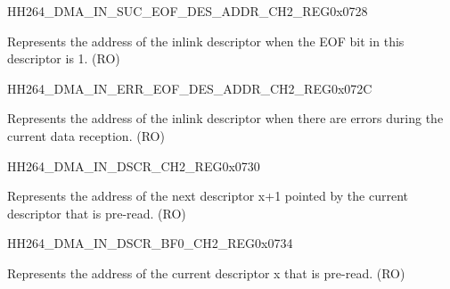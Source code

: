 \begin{register}{H}{H264\_DMA\_IN\_SUC\_EOF\_DES\_ADDR\_CH2\_REG}{0x0728}\label{regdesc:H264DMAINSUCEOFDESADDRCH2REG}
%
\regnewline%
\begin{regdesc}\begin{reglist}
\label{fielddesc:H264DMAINSUCEOFDESADDRCH2}\item [H264\_DMA\_IN\_SUC\_EOF\_DES\_ADDR\_CH2] Represents the address of the inlink descriptor when the EOF bit in this descriptor is 1. (RO)
\end{reglist}\end{regdesc}
\end{register}


\begin{register}{H}{H264\_DMA\_IN\_ERR\_EOF\_DES\_ADDR\_CH2\_REG}{0x072C}\label{regdesc:H264DMAINERREOFDESADDRCH2REG}
%
\regnewline%
\begin{regdesc}\begin{reglist}
\label{fielddesc:H264DMAINERREOFDESADDRCH2}\item [H264\_DMA\_IN\_ERR\_EOF\_DES\_ADDR\_CH2] Represents the address of the inlink descriptor when there are errors during the current data reception. (RO)
\end{reglist}\end{regdesc}
\end{register}


\begin{register}{H}{H264\_DMA\_IN\_DSCR\_CH2\_REG}{0x0730}\label{regdesc:H264DMAINDSCRCH2REG}
%
\regnewline%
\begin{regdesc}\begin{reglist}
\label{fielddesc:H264DMAINLINKDSCRCH2}\item [H264\_DMA\_INLINK\_DSCR\_CH2] Represents the address of the next descriptor x+1 pointed by the current descriptor that is pre-read. (RO)
\end{reglist}\end{regdesc}
\end{register}


\begin{register}{H}{H264\_DMA\_IN\_DSCR\_BF0\_CH2\_REG}{0x0734}\label{regdesc:H264DMAINDSCRBF0CH2REG}
%
\regnewline%
\begin{regdesc}\begin{reglist}
\label{fielddesc:H264DMAINLINKDSCRBF0CH2}\item [H264\_DMA\_INLINK\_DSCR\_BF0\_CH2] Represents the address of the current descriptor x that is pre-read. (RO)
\end{reglist}\end{regdesc}
\end{register}


